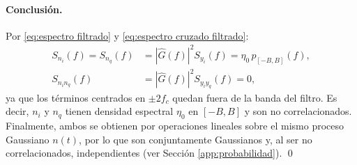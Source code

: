 \paragraph{Conclusión.} Por \eqref{eq:espectro filtrado} y \eqref{eq:espectro cruzado filtrado}:
\begin{align*}
    S_{n_i}(f) = S_{n_q}(f) &= |\hat{G}(f)|^2 S_{y_i}(f) = \eta_0\, p_{[-B,B]}(f),\\
    S_{n_in_q}(f) &= |\hat{G}(f)|^2 S_{y_iy_q}(f) = 0,
\end{align*}
ya que los términos centrados en $\pm 2f_c$ quedan fuera de la banda del filtro. Es decir, $n_i$ y $n_q$ tienen densidad espectral $\eta_0$ en $[-B,B]$ y son no correlacionados. Finalmente, ambos se obtienen por operaciones lineales sobre el mismo proceso Gaussiano $n(t)$, por lo que son conjuntamente Gaussianos y, al ser no correlacionados, independientes (ver Sección \ref{app:probabilidad}). \qed
